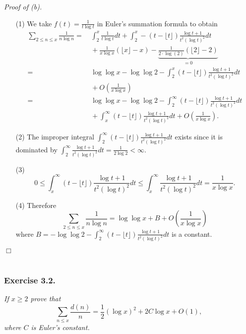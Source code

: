 \documentclass{article}
\begin{document}
\emph{Proof of (b).}
\begin{enumerate}
\item[(1)]
  We take $f(t) = \frac{1}{t\log t}$ in Euler's summation formula to obtain
  \begin{align*}
    \sum_{2 \leq n \leq x} \frac{1}{n\log n}
    = & \: \int_{2}^{x} \frac{1}{t\log t} dt
        + \int_{2}^{x} -(t-\lfloor t \rfloor)\frac{\log t + 1}{t^2 (\log t)^2} dt \\
      & \: + \frac{1}{x \log x}(\lfloor x \rfloor-x)
          - \underbrace{\frac{1}{2 \cdot \log(2)}(\lfloor 2 \rfloor - 2)}_{= 0} \\
    = & \: \log\log x - \log\log2
        - \int_{2}^{x} (t-\lfloor t \rfloor)\frac{\log t + 1}{t^2 (\log t)^2} dt \\
      & \: + O\left( \frac{1}{x \log x} \right) \\
    = & \: \log\log x - \log\log2
        - \int_{2}^{\infty} (t-\lfloor t \rfloor)\frac{\log t + 1}{t^2 (\log t)^2} dt \\
      & \: + \int_{x}^{\infty} (t-\lfloor t \rfloor)\frac{\log t + 1}{t^2 (\log t)^2} dt
        + O\left( \frac{1}{x \log x} \right).
  \end{align*}

\item[(2)]
  The improper integral $\int_{2}^{\infty} (t-\lfloor t \rfloor)\frac{\log t + 1}{t^2 (\log t)^2} dt$
  exists since it is dominated by
  $\int_{2}^{\infty} \frac{\log t + 1}{t^2 (\log t)^2} dt = \frac{1}{2\log 2} < \infty$.

\item[(3)]
  \[
    0
    \leq \int_{x}^{\infty} (t-\lfloor t \rfloor)\frac{\log t + 1}{t^2 (\log t)^2} dt
    \leq \int_{x}^{\infty} \frac{\log t + 1}{t^2 (\log t)^2} dt
    = \frac{1}{x\log x}.
  \]

\item[(4)]
  Therefore
  \[
    \sum_{2 \leq n \leq x} \frac{1}{n\log n}
    = \log\log x + B + O\left( \frac{1}{x\log x} \right)
  \]
  where
  $B = - \log\log2 - \int_{2}^{\infty} (t-\lfloor t \rfloor)\frac{\log t + 1}{t^2 (\log t)^2} dt$
  is a constant.
\end{enumerate}
$\Box$ \\\\






\subsubsection*{Exercise 3.2.}
\emph{If $x \geq 2$ prove that
\[
  \sum_{n \leq x} \frac{d(n)}{n}
  = \frac{1}{2}(\log x)^2 + 2 C \log x + O(1),
\]
where $C$ is Euler's constant.} \\
\end{document}
